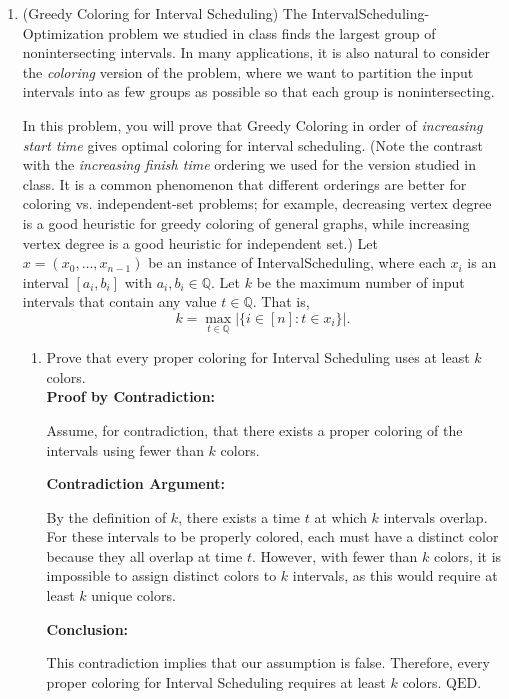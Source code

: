 \documentclass[11pt]{article}
\begin{document}
\begin{enumerate}
    \item (Greedy Coloring for Interval Scheduling) The IntervalScheduling-Optimization problem we studied in class finds the largest group of nonintersecting intervals. 
    In many applications, it is also natural to consider the \emph{coloring} version of the problem, where we want to partition the input intervals into as few groups as possible so that each group is nonintersecting.
 
    In this problem, you will prove that Greedy Coloring in order of \emph{increasing start time} gives optimal coloring for interval scheduling. (Note the contrast with the \emph{increasing finish time} ordering we used for the version studied in class. It is a common phenomenon that different orderings are better for coloring vs. independent-set problems; for example, decreasing vertex degree is a good heuristic for greedy coloring of general graphs, while increasing vertex degree is a good heuristic for independent set.) Let \( x=(x_0,\ldots,x_{n-1}) \) be an instance of IntervalScheduling, where each \( x_i \) is an interval \([a_i,b_i]\) with \( a_i,b_i\in \mathbb{Q} \). Let \( k \) be the maximum number of input intervals that contain any value \( t\in \mathbb{Q} \). That is,
    \[
    k = \max_{t\in \mathbb{Q}} |\{ i\in [n] : t\in x_i\}|.
    \]

    \begin{enumerate}
        \item Prove that every proper coloring for Interval Scheduling uses at least \( k \) colors. \\

        \textbf{Proof by Contradiction:} 

        Assume, for contradiction, that there exists a proper coloring of the intervals using fewer than \( k \) colors.

        \textbf{Contradiction Argument:}

        By the definition of \( k \), there exists a time \( t \) at which \( k \) intervals overlap. For these intervals to be properly colored, each must have a distinct color because they all overlap at time \( t \). However, with fewer than \( k \) colors, it is impossible to assign distinct colors to \( k \) intervals, as this would require at least \( k \) unique colors.

        \textbf{Conclusion:}

        This contradiction implies that our assumption is false. Therefore, every proper coloring for Interval Scheduling requires at least \( k \) colors. \(\text{QED}\). \\


\end{enumerate}
\end{enumerate}
\end{document}
